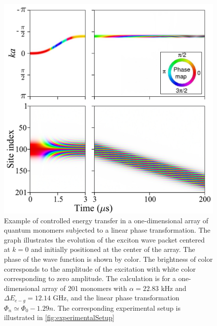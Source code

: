 \begin{figure}[htbp]
\centering
\includegraphics[width=\linewidth]{momentum-kick.pdf}
\caption{
Example of controlled energy transfer in a one-dimensional array of quantum 
monomers subjected to a linear phase transformation. The graph illustrates the evolution of the exciton wave packet  
 centered at $k=0$ and initially positioned at the center of the array. The phase of the wave function
is shown by color.  The brightness of color corresponds to the amplitude of the excitation with white color
 corresponding to zero amplitude. The calculation is for a one-dimensional array
of 201 monomers with $\alpha = 22.83$ kHz and $\Delta E_{e-g} =12.14$ GHz,  and the linear phase transformation 
$\Phi_n \simeq \Phi_0  -1.29 n$. The corresponding experimental setup is illustrated in
 \autoref{fig:experimentalSetup}
}
\label{momentum-kick}
\end{figure}



